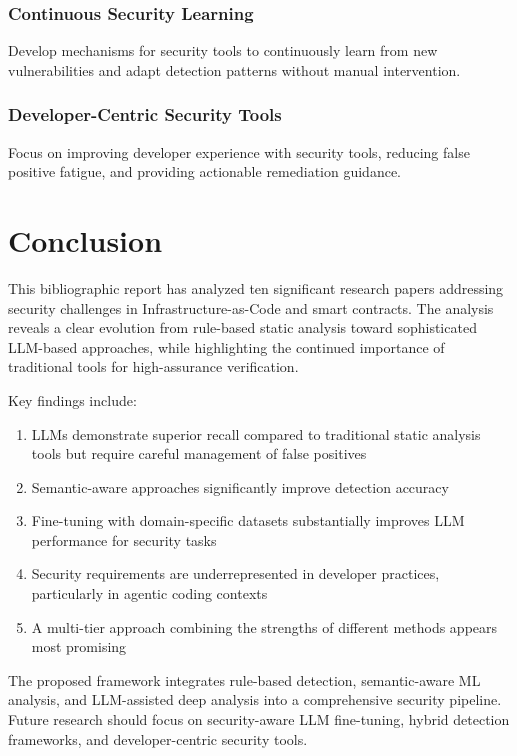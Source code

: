 \documentclass[11pt,a4paper]{article}
\begin{document}
\subsubsection{Continuous Security Learning}
Develop mechanisms for security tools to continuously learn from new vulnerabilities and adapt detection patterns without manual intervention.

\subsubsection{Developer-Centric Security Tools}
Focus on improving developer experience with security tools, reducing false positive fatigue, and providing actionable remediation guidance.

\section{Conclusion}

This bibliographic report has analyzed ten significant research papers addressing security challenges in Infrastructure-as-Code and smart contracts. The analysis reveals a clear evolution from rule-based static analysis toward sophisticated LLM-based approaches, while highlighting the continued importance of traditional tools for high-assurance verification.

Key findings include:

\begin{enumerate}
    \item LLMs demonstrate superior recall compared to traditional static analysis tools but require careful management of false positives
    \item Semantic-aware approaches significantly improve detection accuracy
    \item Fine-tuning with domain-specific datasets substantially improves LLM performance for security tasks
    \item Security requirements are underrepresented in developer practices, particularly in agentic coding contexts
    \item A multi-tier approach combining the strengths of different methods appears most promising
\end{enumerate}

The proposed framework integrates rule-based detection, semantic-aware ML analysis, and LLM-assisted deep analysis into a comprehensive security pipeline. Future research should focus on security-aware LLM fine-tuning, hybrid detection frameworks, and developer-centric security tools.
\end{document}
